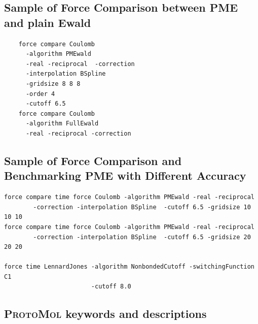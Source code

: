 \documentclass[11pt]{report}
\newcommand{\ProtoMol}{\textsc{ProtoMol }}
\begin{document}
\subsection{Sample of Force Comparison between PME and plain Ewald}

\begin{verbatim}
    force compare Coulomb 
      -algorithm PMEwald 
      -real -reciprocal  -correction 
      -interpolation BSpline
      -gridsize 8 8 8
      -order 4     
      -cutoff 6.5
    force compare Coulomb 
      -algorithm FullEwald 
      -real -reciprocal -correction
\end{verbatim}

\subsection{Sample of Force Comparison and  Benchmarking PME with
Different Accuracy}

\begin{verbatim}
force compare time force Coulomb -algorithm PMEwald -real -reciprocal  
        -correction -interpolation BSpline  -cutoff 6.5 -gridsize 10 10 10
force compare time force Coulomb -algorithm PMEwald -real -reciprocal  
        -correction -interpolation BSpline  -cutoff 6.5 -gridsize 20 20 20

force time LennardJones -algorithm NonbondedCutoff -switchingFunction C1 
                        -cutoff 8.0
\end{verbatim}


\newpage

\subsection{\ProtoMol keywords and descriptions}
\label{sec:keywordtable}
\end{document}
